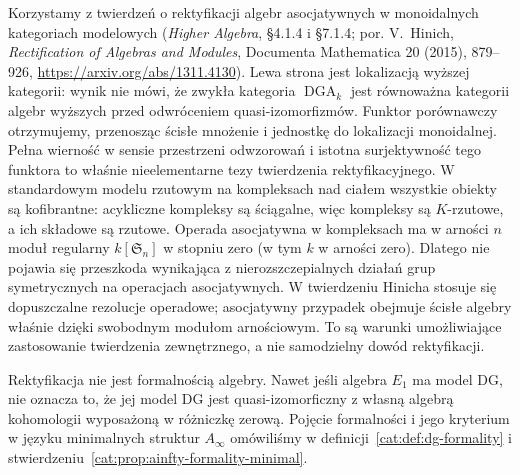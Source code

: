 Korzystamy z twierdzeń o rektyfikacji algebr asocjatywnych w monoidalnych kategoriach modelowych (\emph{Higher Algebra}, \S4.1.4 i \S7.1.4; por. V.~Hinich, \emph{Rectification of Algebras and Modules}, Documenta Mathematica 20 (2015), 879--926, \url{https://arxiv.org/abs/1311.4130}). Lewa strona jest lokalizacją wyższej kategorii: wynik nie mówi, że zwykła kategoria $\operatorname{DGA}_k$ jest równoważna kategorii algebr wyższych przed odwróceniem quasi-izomorfizmów. Funktor porównawczy otrzymujemy, przenosząc ścisłe mnożenie i jednostkę do lokalizacji monoidalnej. Pełna wierność w sensie przestrzeni odwzorowań i istotna surjektywność tego funktora to właśnie nieelementarne tezy twierdzenia rektyfikacyjnego. W standardowym modelu rzutowym na kompleksach nad ciałem wszystkie obiekty są kofibrantne: acykliczne kompleksy są ściągalne, więc kompleksy są $K$-rzutowe, a ich składowe są rzutowe. Operada asocjatywna w kompleksach ma w arności $n$ moduł regularny $k[\mathfrak S_n]$ w stopniu zero (w tym $k$ w arności zero). Dlatego nie pojawia się przeszkoda wynikająca z nierozszczepialnych działań grup symetrycznych na operacjach asocjatywnych. W twierdzeniu Hinicha stosuje się dopuszczalne rezolucje operadowe; asocjatywny przypadek obejmuje ścisłe algebry właśnie dzięki swobodnym modułom arnościowym. To są warunki umożliwiające zastosowanie twierdzenia zewnętrznego, a nie samodzielny dowód rektyfikacji.

\begin{uwaga}\label{cat:rem:infty-rectification-not-formality}
Rektyfikacja nie jest formalnością algebry. Nawet jeśli algebra $E_1$ ma model DG, nie oznacza to, że jej model DG jest quasi-izomorficzny z własną algebrą kohomologii wyposażoną w różniczkę zerową. Pojęcie formalności i jego kryterium w języku minimalnych struktur $A_\infty$ omówiliśmy w definicji~\ref{cat:def:dg-formality} i stwierdzeniu~\ref{cat:prop:ainfty-formality-minimal}.
\end{uwaga}


